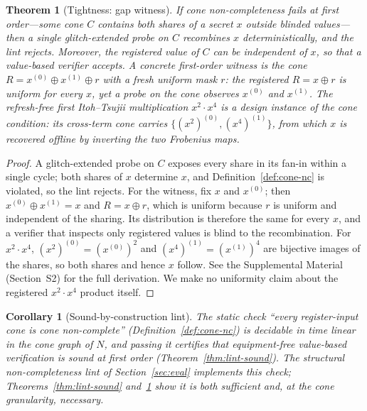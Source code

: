 \documentclass[lettersize,journal]{IEEEtran}
\newtheorem{theorem}{Theorem}
\newtheorem{corollary}{Corollary}
\begin{document}
\begin{theorem}[Tightness: gap witness]
\label{thm:gap-witness}
If cone non-completeness fails at first order---some cone $C$ contains both
shares of a secret $x$ outside blinded values---then a single glitch-extended probe on
$C$ recombines $x$ deterministically, and the lint rejects. Moreover, the
registered value of $C$ can be independent of $x$, so that a value-based
verifier accepts. A concrete first-order witness is the cone
$R=x^{(0)}{\oplus}x^{(1)}{\oplus}r$ with a fresh uniform mask $r$: the
registered $R=x{\oplus}r$ is uniform for every $x$, yet a probe on the cone
observes $x^{(0)}$ and $x^{(1)}$. The refresh-free first Itoh--Tsujii
multiplication $x^{2}{\cdot}x^{4}$ is a design instance of the cone condition:
its cross-term cone carries $\{(x^{2})^{(0)},(x^{4})^{(1)}\}$, from which
$x$ is recovered offline by inverting the two Frobenius maps.
\end{theorem}
\begin{proof}
A glitch-extended probe on $C$ exposes every share in its fan-in within a
single cycle; both shares of $x$ determine $x$, and Definition~\ref{def:cone-nc}
is violated, so the lint rejects. For the witness, fix $x$ and $x^{(0)}$; then
$x^{(0)}{\oplus}x^{(1)}=x$ and $R=x{\oplus}r$, which is uniform because $r$ is
uniform and independent of the sharing. Its distribution is therefore the same
for every $x$, and a verifier that inspects only registered values is blind to
the recombination. For $x^{2}{\cdot}x^{4}$, $(x^{2})^{(0)}=(x^{(0)})^{2}$ and
$(x^{4})^{(1)}=(x^{(1)})^{4}$ are bijective images of the shares, so both
shares and hence $x$ follow. See the Supplemental Material (Section~S2) for the
full derivation. We make no uniformity claim about the registered
$x^{2}{\cdot}x^{4}$ product itself.
\end{proof}

\begin{corollary}[Sound-by-construction lint]
\label{cor:lint}
The static check ``every register-input cone is cone non-complete''
(Definition~\ref{def:cone-nc}) is decidable in time linear in the cone graph
of $N$, and passing it certifies that equipment-free value-based verification
is sound at first order (Theorem~\ref{thm:lint-sound}). The structural
non-completeness lint of Section~\ref{sec:eval} implements this check;
Theorems~\ref{thm:lint-sound} and~\ref{thm:gap-witness} show it is both
sufficient and, at the cone granularity, necessary.
\end{corollary}
\end{document}
